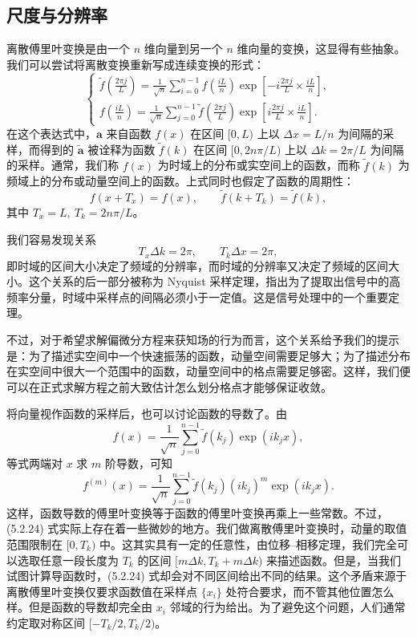 \subsection{尺度与分辨率}

离散傅里叶变换是由一个 $n$ 维向量到另一个 $n$ 维向量的变换，这显得有些抽象。我们可以尝试将离散变换重新写成连续变换的形式：
\begin{equation}
\begin{cases}
\displaystyle
\tilde f\!\left(\frac{2\pi j}{L}\right)
=\frac1{\sqrt n}\sum_{i=0}^{n-1}f\!\left(\frac{iL}{n}\right)
\exp\!\left[-i\frac{2\pi j}{L}\times\frac{iL}{n}\right],\\[10pt]
\displaystyle
f\!\left(\frac{iL}{n}\right)
=\frac1{\sqrt n}\sum_{j=0}^{n-1}\tilde f\!\left(\frac{2\pi j}{L}\right)
\exp\!\left[i\frac{2\pi j}{L}\times\frac{iL}{n}\right].
\end{cases}
\tag{5.2.20}
\end{equation}
在这个表达式中，$\bm a$ 来自函数 $f(x)$ 在区间 $[0,L)$ 上以 $\Delta x=L/n$ 为间隔的采样，而得到的 $\tilde{\bm a}$ 被诠释为函数 $\tilde f(k)$ 在区间 $[0,2n\pi/L)$ 上以 $\Delta k=2\pi/L$ 为间隔的采样。通常，我们称 $f(x)$ 为时域上的分布或实空间上的函数，而称 $\tilde f(k)$ 为频域上的分布或动量空间上的函数。上式同时也假定了函数的周期性：
\begin{equation}
f(x+T_x)=f(x),\qquad \tilde f(k+T_k)=\tilde f(k),
\tag{5.2.21}
\end{equation}
其中 $T_x=L,\ T_k=2n\pi/L$。

我们容易发现关系
\begin{equation}
T_x\Delta k=2\pi,\qquad T_k\Delta x=2\pi,
\tag{5.2.22}
\end{equation}
即时域的区间大小决定了频域的分辨率，而时域的分辨率又决定了频域的区间大小。这个关系的后一部分被称为 Nyquist 采样定理，指出为了提取出信号中的高频率分量，时域中采样点的间隔必须小于一定值。这是信号处理中的一个重要定理。

不过，对于希望求解偏微分方程来获知场的行为而言，这个关系给予我们的提示是：为了描述实空间中一个快速振荡的函数，动量空间需要足够大；为了描述分布在实空间中很大一个范围中的函数，动量空间中的格点需要足够密。这样，我们便可以在正式求解方程之前大致估计怎么划分格点才能够保证收敛。

将向量视作函数的采样后，也可以讨论函数的导数了。由
\begin{equation}
f(x)=\frac1{\sqrt n}\sum_{j=0}^{n-1}\tilde f(k_j)\exp(ik_jx),
\tag{5.2.23}
\end{equation}
等式两端对 $x$ 求 $m$ 阶导数，可知
\begin{equation}
f^{(m)}(x)=\frac1{\sqrt n}\sum_{j=0}^{n-1}\tilde f(k_j)(ik_j)^m\exp(ik_jx).
\tag{5.2.24}
\end{equation}
这样，函数导数的傅里叶变换等于函数的傅里叶变换再乘上一些常数。不过，(5.2.24) 式实际上存在着一些微妙的地方。我们做离散傅里叶变换时，动量的取值范围限制在 $[0,T_k)$ 中。这其实具有一定的任意性，由位移--相移定理，我们完全可以选取任意一段长度为 $T_k$ 的区间 $[m\Delta k,T_k+m\Delta k)$ 来描述函数。但是，当我们试图计算导函数时，(5.2.24) 式却会对不同区间给出不同的结果。这个矛盾来源于离散傅里叶变换仅要求函数值在采样点 $\{x_i\}$ 处符合要求，而不管其他位置怎么样。但是函数的导数却完全由 $x_i$ 邻域的行为给出。为了避免这个问题，人们通常约定取对称区间 $[-T_k/2,T_k/2)$。

